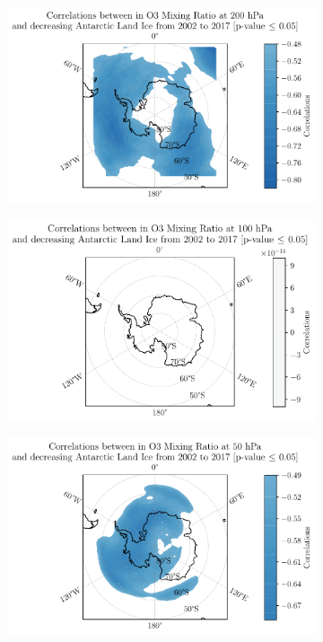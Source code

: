 \documentclass[../main.tex]{subfiles}
\begin{document}
\begin{figure}[hbt!]
\begin{subfigure}[b]{0.45\textwidth}
    \includegraphics[width=\textwidth]{images/2021w5/chapter7/hres/decreasing_correlation_spatial_o3_200}
    \end{subfigure}
    \begin{subfigure}[b]{0.45\textwidth}
    \includegraphics[width=\textwidth]{images/2021w5/chapter7/hres/decreasing_correlation_spatial_o3_100}
    \end{subfigure}
    \begin{subfigure}[b]{0.45\textwidth}
    \includegraphics[width=\textwidth]{images/2021w5/chapter7/hres/decreasing_correlation_spatial_o3_50}

\end{subfigure}
\end{figure}
\end{document}
